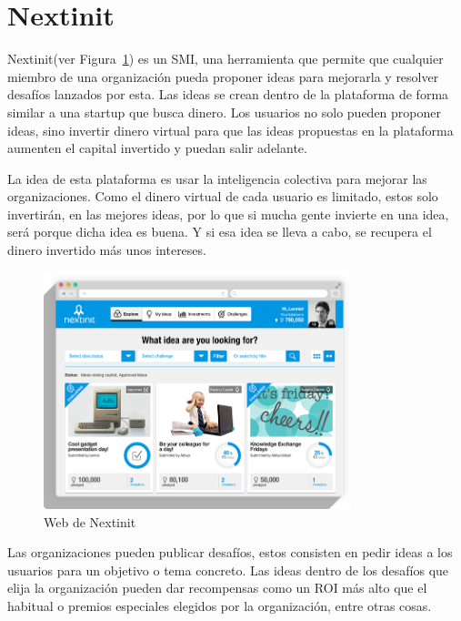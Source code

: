  
 \section{Nextinit}
 
 Nextinit(ver Figura~\ref{fig:web}) es un \acs{SMI}, una herramienta que permite que cualquier miembro de una organización pueda
 proponer ideas para  mejorarla y resolver desafíos lanzados por esta. Las ideas se crean dentro de la 
 plataforma de forma similar a una startup que busca dinero. Los usuarios no solo pueden  proponer ideas, sino 
 invertir dinero virtual para que las ideas propuestas en la plataforma aumenten el capital invertido y 
 puedan salir adelante.
 
 La idea de esta plataforma es usar la inteligencia colectiva para mejorar las organizaciones. Como el dinero 
 virtual de cada usuario es limitado, estos solo invertirán,  en las mejores ideas, por lo que si mucha gente 
 invierte en una idea, será porque dicha idea es buena. Y si esa idea se lleva a cabo, se recupera el dinero 
 invertido  más unos intereses.
 
  \begin{figure}[!h]
 	\begin{center}
 		\includegraphics[width=0.8\textwidth]{./img/introduccion/nextinit.png}
 		\caption{Web de Nextinit}
 		\label{fig:web}
 	\end{center}
 \end{figure}
 
 Las organizaciones pueden publicar desafíos, estos consisten en pedir ideas a los usuarios para un 
 objetivo o tema concreto. Las ideas dentro de los desafíos que elija la organización pueden dar 
 recompensas como un \acs{ROI} más alto que el habitual o premios especiales elegidos
 por la organización, entre otras cosas.
  
